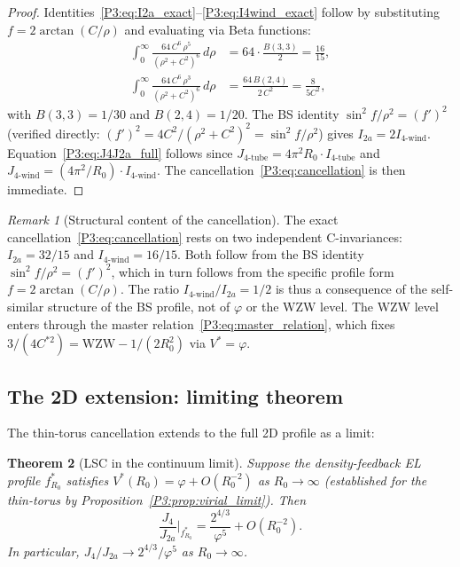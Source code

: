 \documentclass[11pt,a4paper]{article}
\newtheorem{theorem}{Theorem}[section]
\theoremstyle{definition}
\theoremstyle{remark}
\newtheorem{remark}[theorem]{Remark}
\newcommand{\vp}{\varphi}
\begin{document}
\begin{proof}
Identities~\eqref{P3:eq:I2a_exact}--\eqref{P3:eq:I4wind_exact} follow by
substituting $f=2\arctan(C/\rho)$ and evaluating via Beta functions:
\begin{align*}
  \int_0^\infty \frac{64\,C^6\,\rho^5}{(\rho^2+C^2)^6}\,d\rho
  &= 64\cdot\frac{B(3,3)}{2} = \frac{16}{15}, \\
  \int_0^\infty \frac{64\,C^6\,\rho^3}{(\rho^2+C^2)^6}\,d\rho
  &= \frac{64\,B(2,4)}{2\,C^2} = \frac{8}{5C^2},
\end{align*}
with $B(3,3) = 1/30$ and $B(2,4) = 1/20$.
The BS identity $\sin^2\!f/\rho^2 = (f')^2$ (verified directly:
$(f')^2 = 4C^2/(\rho^2+C^2)^2 = \sin^2\!f/\rho^2$) gives $I_{2a} = 2I_{4\text{-wind}}$.
Equation~\eqref{P3:eq:J4J2a_full} follows since
$J_{4\text{-tube}} = 4\pi^2 R_0 \cdot I_{4\text{-tube}}$ and
$J_{4\text{-wind}} = (4\pi^2/R_0)\cdot I_{4\text{-wind}}$.
The cancellation~\eqref{P3:eq:cancellation} is then immediate.
\end{proof}

\begin{remark}[Structural content of the cancellation]
\label{P3:rem:cancellation_structure}
The exact cancellation~\eqref{P3:eq:cancellation} rests on two
independent C-invariances: $I_{2a} = 32/15$ and $I_{4\text{-wind}} = 16/15$.
Both follow from the BS identity $\sin^2\!f/\rho^2 = (f')^2$,
which in turn follows from the specific profile form $f=2\arctan(C/\rho)$.
The ratio $I_{4\text{-wind}}/I_{2a}=1/2$ is thus a consequence of
the self-similar structure of the BS profile, not of $\vp$ or the WZW level.
The WZW level enters through the master relation~\eqref{P3:eq:master_relation},
which fixes $3/(4C^{*2}) = \text{WZW} - 1/(2R_0^2)$ via $V^*=\vp$.
\end{remark}

\subsection{The 2D extension: limiting theorem}

The thin-torus cancellation extends to the full 2D profile as a limit:

\begin{theorem}[LSC in the continuum limit]
\label{P3:thm:lsc_2d_limit}
Suppose the density-feedback EL profile $f^*_{R_0}$ satisfies
$V^*(R_0) = \vp + O(R_0^{-2})$ as $R_0\to\infty$
(established for the thin-torus by Proposition~\ref{P3:prop:virial_limit}).
Then
\begin{equation}
  \frac{J_4}{J_{2a}}\bigg|_{f^*_{R_0}} = \frac{2^{4/3}}{\vp^5} + O(R_0^{-2}).
  \label{P3:eq:lsc_limit}
\end{equation}
In particular, $J_4/J_{2a} \to 2^{4/3}/\vp^5$ as $R_0\to\infty$.
\end{theorem}
\end{document}
